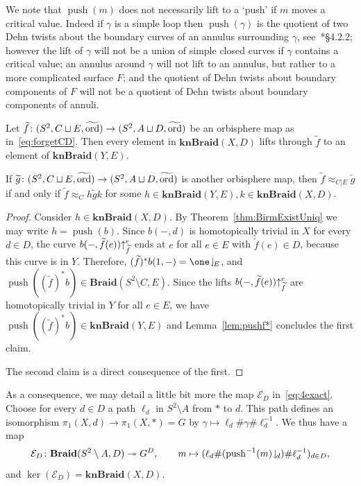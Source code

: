 \documentclass{amsart}
\newcommand\Antipush{{\mathcal E}}
\newcommand\Push{{\operatorname{push}}}
\newcommand\Braid{{\mathbf{Braid}}}
\newcommand\knBraid{{\mathbf{knBraid}}}
\newcommand\wtf{{\widetilde f}}
\newcommand\wtg{{\widetilde g}}
\newcommand\wtord{{\widetilde\ord}}
\begin{document}
We note that $\Push(m)$ does not necessarily lift to a `push' if $m$
moves a critical value. Indeed if $\gamma$ is a simple loop then
$\Push(\gamma)$ is the quotient of two Dehn twists about the boundary
curves of an annulus surrounding $\gamma$,
see~\cite{farb-margalit:mcg}*{\S4.2.2}; however the lift of $\gamma$
will not be a union of simple closed curves if $\gamma$ contains a
critical value; an annulus around $\gamma$ will not lift to an
annulus, but rather to a more complicated surface $F$; and the quotient
of Dehn twists about boundary components of $F$ will not be a quotient
of Dehn twists about boundary components of annuli.

\begin{prop}\label{prop:knittinginert}
  Let
  $\wtf\colon(S^2,C\sqcup E,\wtord)\to (S^2,A\sqcup
  D,\wtord)$ be an orbisphere map as
  in~\eqref{eq:forgetCD}. Then every element in $\knBraid(X,D)$ lifts
  through $\wtf$ to an element of $\knBraid(Y,E)$.

  If
  $\wtg\colon(S^2,C\sqcup E,\wtord)\to(S^2,A\sqcup
  D,\wtord)$ is another orbisphere map, then
  $\wtf\approx_{C|E} \wtg$ if and only if $\wtf\approx_{C} h \wtg k$
  for some $h\in\knBraid(Y,E),k\in\knBraid(X,D)$.
\end{prop}
\begin{proof}
  Consider $h\in \knBraid(X,D)$. By Theorem~\ref{thm:BirmExistUniq} we
  may write $h=\Push(b)$. Since $b(-,d)$ is homotopically trivial in
  $X$ for every $d\in D$, the curve $b(-,\wtf(e))\lift\wtf e$ ends at
  $e$ for all $e\in E$ with $\wtf(e)\in D$, because this curve is in
  $Y$. Therefore, $(\wtf)^*b(1,-)=\one\restrict E$, and
  $\Push((\wtf)^*b)\in \Braid(S^2\setminus C,E)$. Since the lifts
  $b(-,\wtf(e))\lift\wtf e$ are homotopically trivial in $Y$ for all
  $e\in E$, we have $\Push((\wtf)^*b)\in\knBraid(Y,E)$ and
  Lemma~\ref{lem:pushf*} concludes the first claim.

  The second claim is a direct consequence of the first.
\end{proof}

As a consequence, we may detail a little bit more the map
$\Antipush_D$ in~\eqref{eq:4exact}. Choose for every $d\in D$ a path
$\ell_d$ in $S^2\setminus A$ from $*$ to $d$. This path defines an
isomorphism $\pi_1(X,d)\to\pi_1(X,*)=G$ by
$\gamma\mapsto\ell_d\#\gamma\#\ell_d^{-1}$. We thus have a map
\begin{equation}\label{eq:antipush}
  \Antipush_D\colon\Braid(S^2\setminus A,D)\twoheadrightarrow G^D,\qquad m\mapsto(\ell_d\#(\Push^{-1}(m)\restrict d)\#\ell_d^{-1})_{d\in D},
\end{equation}
and $\ker(\Antipush_D)=\knBraid(X,D)$.
\end{document}
